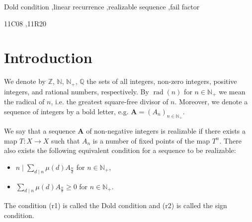 \documentclass[preprint,12pt]{elsarticle}
\newcommand{\N}{\mathbb{N}}
\newcommand{\Z}{\mathbb{Z}}
\newcommand{\Q}{\mathbb{Q}}
\DeclareMathOperator{\rad}{rad}
\begin{document}
\begin{frontmatter}
\begin{abstract}
\end{abstract}



\begin{keyword}
Dold condition \sep linear recurrence \sep realizable sequence \sep fail factor

\MSC[2020] 11C08  \sep 11R20

\end{keyword}

\end{frontmatter}






\section{Introduction}

We denote by $\Z$, $\N$, $\N_+$, $\Q$ the sets of all integers, non-zero integers, positive integers, and rational numbers, respectively. By $\rad(n)$ for $n\in \N_+$ we mean the radical of $n$, i.e. the greatest square-free divisor of $n$. Moreover, we denote a sequence of integers by a bold letter, e.g. $\mathbf{A} =(A_n)_{n\in\N_+}$.

We say that a sequence $\mathbf A$ of non-negative integers is realizable if there exists a map $T:X\to X$ such that $A_n$ is a number of fixed points of the map $T^n$. There also exists the following equivalent condition for a sequence to be realizable: 

\begin{itemize}
    \item [(r1)] $n \mid \sum_{d\mid n} \mu(d)A_{\frac{n}{d}}$ \quad for $n \in \N_+$, 
    \item [(r2)] $\sum_{d\mid n} \mu(d) A_{\frac{n}{d}} \geqslant 0$ \quad for $n \in \N_+$.
\end{itemize}
The condition (r1) is called the Dold condition and (r2) is called the sign condition.
\end{document}
